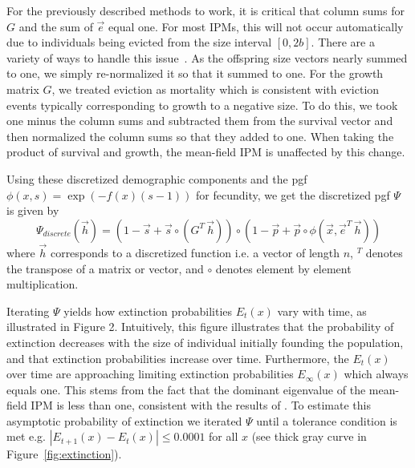 \documentclass[12pt]{amsart}\usepackage[]{graphicx}\usepackage[]{color}
\begin{document}
For the previously described methods to work, it is critical that column sums for $G$ and the sum of $\vec e$ equal one. For most IPMs, this will not occur automatically due to individuals being evicted from the size interval $[0,2b]$. There are a variety of ways to handle this issue~\citep{williams-etal-12}. As the  offspring size vectors nearly summed to one, we simply re-normalized it so that it summed to one. For the growth matrix $G$, we treated eviction as mortality which is consistent with eviction events typically corresponding to growth to a negative size. To do this, we took one minus the column sums and subtracted them from the survival vector and then normalized the column sums so that they added to one. When taking the product of survival and growth, the mean-field IPM is unaffected by this change.

Using these discretized demographic components and the pgf $\phi(x,s)=\exp(-f(x)(s-1))$ for fecundity, we get the discretized pgf $\Psi$ is given by
\[
\Psi_{discrete}(\vec h)=(1-\vec s+\vec s\circ (G^T\, \vec h))\circ(1-\vec p+\vec p\circ \phi(\vec x,\vec e^T\,\vec h))
\]
where $\vec h$ corresponds to a discretized function i.e. a vector of length $n$, $^T$ denotes the transpose of a matrix or vector,  and $\circ$ denotes element by element multiplication.





Iterating $\Psi$ yields how extinction probabilities $E_t(x)$ vary with time, as illustrated in Figure 2. Intuitively, this figure illustrates that the probability of extinction decreases with the size of individual initially founding the population, and that extinction probabilities increase over time. Furthermore, the $E_t(x)$ over time are approaching limiting extinction probabilities $E_{\infty}(x)$ which always equals one. This stems from the fact that the dominant eigenvalue of the mean-field IPM is less than one, consistent with the results of \citet{salguero-etal-12}. To estimate this asymptotic probability of extinction we  iterated $\Psi$ until a tolerance condition is met e.g. $|E_{t+1}(x)-E_t(x)|\le 0.0001$ for all $x$ (see thick gray curve in Figure~\ref{fig:extinction}).
\end{document}
